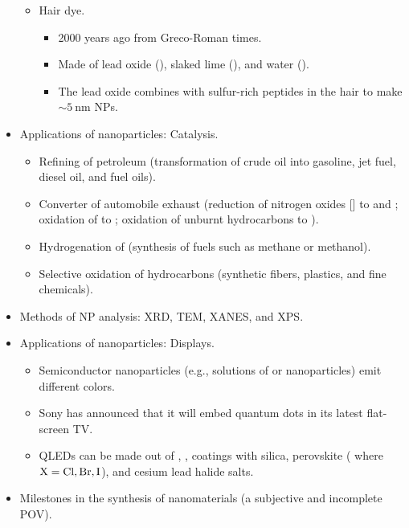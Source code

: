 \documentclass[../notes.tex]{subfiles}
\begin{document}
\begin{itemize}
\begin{itemize}
\begin{itemize}
        \end{itemize}
        \item Hair dye.
        \begin{itemize}
            \item 2000 years ago from Greco-Roman times.
            \item Made of lead oxide (), slaked lime (), and water ().
            \item The lead oxide combines with sulfur-rich peptides in the hair to make $\sim\SI{5}{\nano\meter}$  NPs.
        \end{itemize}
    \end{itemize}
    \item Applications of nanoparticles: Catalysis.
    \begin{itemize}
        \item Refining of petroleum (transformation of crude oil into gasoline, jet fuel, diesel oil, and fuel oils).
        \item Converter of automobile exhaust (reduction of nitrogen oxides [] to  and ; oxidation of  to ; oxidation of unburnt hydrocarbons to ).
        \item Hydrogenation of  (synthesis of fuels such as methane or methanol).
        \item Selective oxidation of hydrocarbons (synthetic fibers, plastics, and fine chemicals).
    \end{itemize}
    \item Methods of NP analysis: XRD, TEM, XANES, and XPS.
    \item Applications of nanoparticles: Displays.
    \begin{itemize}
        \item Semiconductor nanoparticles (e.g., solutions of  or  nanoparticles) emit different colors.
        \item Sony has announced that it will embed quantum dots in its latest flat-screen TV.
        \item QLEDs can be made out of , ,  coatings with silica, perovskite ( where $\ce{X}=\ce{Cl},\ce{Br},\ce{I}$), and cesium lead halide salts.
    \end{itemize}
    \item Milestones in the synthesis of nanomaterials (a subjective and incomplete POV).
    \begin{itemize}

\end{itemize}
\end{itemize}
\end{document}

